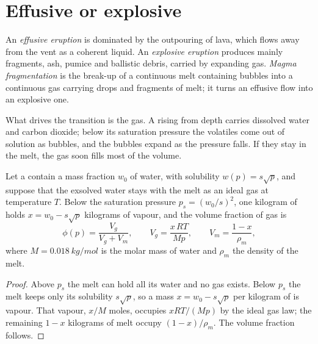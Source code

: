 \section{Effusive or explosive}

\begin{definition}\label{def:b2:eruptive-styles:regimes}
An \emph{effusive eruption} is dominated by the
outpouring of lava, which flows away from the vent as a coherent liquid. An
\emph{explosive eruption} produces mainly fragments,
ash, pumice and ballistic debris, carried by expanding gas. \emph{Magma
fragmentation} is the break-up of a continuous melt
containing bubbles into a continuous gas carrying drops and fragments of melt;
it turns an effusive flow into an explosive one.
\end{definition}

What drives the transition is the gas. A  rising from depth carries
dissolved water and carbon dioxide; below its saturation pressure the volatiles
come out of solution as bubbles, and the bubbles expand as the pressure falls.
If they stay in the melt, the gas soon fills most of the volume.

\begin{proposition}\label{prop:b2:eruptive-styles:gas}
Let a  contain a mass fraction $w_0$ of water, with solubility $w(p) =
s\sqrt p$, and suppose that the exsolved water stays with the melt as an ideal
gas at temperature $T$. Below the saturation pressure $p_s = (w_0/s)^2$, one
kilogram of  holds $x = w_0 - s\sqrt p$ kilograms of vapour, and the volume
fraction of gas is
\[
\phi(p) = \frac{V_g}{V_g + V_m}, \qquad V_g = \frac{x\,RT}{M p}, \qquad
V_m = \frac{1 - x}{\rho_m},
\]
where $M = \qty{0.018}{kg/mol}$ is the molar mass of water and $\rho_m$ the density
of the melt.
\end{proposition}

\begin{proof}
Above $p_s$ the melt can hold all its water and no gas exists. Below $p_s$ the
melt keeps only its solubility $s\sqrt p$, so a mass $x = w_0 - s\sqrt p$ per
kilogram of  is vapour. That vapour, $x/M$ moles, occupies $xRT/(Mp)$ by the
ideal gas law; the remaining $1 - x$ kilograms of melt occupy $(1 - x)/\rho_m$.
The volume fraction follows.
\end{proof}


